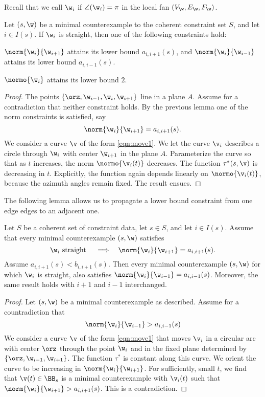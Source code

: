 Recall that we call $\w_i$  
if $\angle(\w_i)=\pi$ in the local fan $(V_\w,E_\w,F_\w)$.

\begin{lemma} 
Let $(s,\w)$ be a minimal counterexample to the coherent constraint
set $S$, and let $i\in I(s)$. 
If $\w_i$ is straight, then one of the following constraints hold:
\item $\norm{\w_i}{\w_{i+1}}$ attains its lower bound $a_{i,i+1}(s)$, and
 $\norm{\w_i}{\w_{i-1}}$ attains its lower bound $a_{i,i-1}(s)$.
\item $\normo{\w_i}$ attains its lower bound $2$.
\end{lemma}

\begin{proof}  The points $\{\orz,\w_{i-1},\w_i,\w_{i+1}\}$ line in a plane $A$.
Assume for a contradiction that neither constraint holds.  By the previous
lemma one of the norm constraints is satisfied, say
\[
\norm{\w_i}{\w_{i+1}}=a_{i,i+1}(s).
\]
We consider a  curve $\v$ of the form \eqref{eqn:move1}.
We let the curve $\v_i$ describes a circle through
 $\w_i$ with center $\w_{i+1}$ in the plane $A$.  Parameterize the curve
so that as $t$ increases, the norm $\normo{\v_i(t)}$ decreases.
The function $\tau^*(s,\v)$ is decreasing in $t$.  Explicitly, the
function again depends linearly on $\normo{\v_i(t)}$, because
the azimuth angles remain fixed.  The result ensues.
\end{proof}

The following lemma allows us to propagate a lower bound constraint
from one edge edges to an adjacent one.

\begin{lemma} 
Let $S$ be a coherent set of constraint data, let $s\in S$, and let
$i\in I(s)$.
Assume that every minimal counterexample $(s,\w)$ satisfies
\[
\w_i \text{ straight } \quad\Longrightarrow\quad \norm{\w_i}{\w_{i+1}}=a_{i,i+1}(s).
\]
Assume $a_{i,i+1}(s)<b_{i,i+1}(s)$.
Then every minimal counterexample $(s,\w)$
for which $\w_i$ is straight, also satisfies $\norm{\w_i}{\w_{i-1}}=a_{i,i-1}(s)$.
Moreover, the same result holds with $i+1$ and $i-1$ interchanged.
\end{lemma}

\begin{proof}
Let $(s,\w)$ be a minimal counterexample as described.
Assume for a countradiction that 
\[
\norm{\w_i}{\w_{i-1}}>a_{i,i-1}(s)
\]
We consider a curve $\v$ of the form \eqref{eqn:move1} that moves $\v_i$
in a circular arc with center $\orz$ through the point $\w_i$ and in
the fixed plane determined by $\{\orz,\w_{i-1},\w_{i+1}\}$.  The function $\tau^*$ is
constant along this curve.  We orient the curve to be increasing
in $\norm{\w_i}{\w_{i+1}}$.  For sufficiently, small $t$, we find that
$\v(t)\in\BB_s$ is a minimal counterexample with $\v_i(t)$ such that
$\norm{\w_i}{\w_{i+1}} > a_{i,i+1}(s)$. This is a contradiction.
\end{proof}

